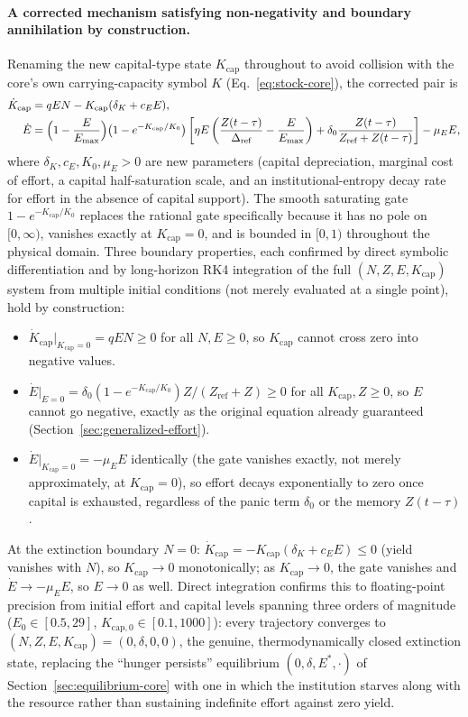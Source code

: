 \documentclass[twocolumn,10pt]{article}
\begin{document}
\paragraph{A corrected mechanism satisfying non-negativity and boundary annihilation by construction.} Renaming the new capital-type state $K_{\text{cap}}$ throughout to avoid collision with the core's own carrying-capacity symbol $K$ (Eq.~\eqref{eq:stock-core}), the corrected pair is
\begin{align}
\dot K_{\text{cap}} &= qEN - K_{\text{cap}}(\delta_K+c_EE), \label{eq:kcap-tether}\\
\dot E &= \Bigl(1-\frac{E}{E_{\max}}\Bigr)\bigl(1-e^{-K_{\text{cap}}/K_0}\bigr)\left[\eta E\left(\frac{Z(t-\tau)}{\Delta_{\text{ref}}}-\frac{E}{E_{\max}}\right)+\delta_0\frac{Z(t-\tau)}{Z_{\text{ref}}+Z(t-\tau)}\right]-\mu_EE, \label{eq:effort-tethered}
\end{align}
where $\delta_K,c_E,K_0,\mu_E>0$ are new parameters (capital depreciation, marginal cost of effort, a capital half-saturation scale, and an institutional-entropy decay rate for effort in the absence of capital support). The smooth saturating gate $1-e^{-K_{\text{cap}}/K_0}$ replaces the rational gate specifically because it has no pole on $[0,\infty)$, vanishes exactly at $K_{\text{cap}}=0$, and is bounded in $[0,1)$ throughout the physical domain. Three boundary properties, each confirmed by direct symbolic differentiation and by long-horizon RK4 integration of the full $(N,Z,E,K_{\text{cap}})$ system from multiple initial conditions (not merely evaluated at a single point), hold by construction:
\begin{itemize}
\item $\dot K_{\text{cap}}|_{K_{\text{cap}}=0}=qEN\ge0$ for all $N,E\ge0$, so $K_{\text{cap}}$ cannot cross zero into negative values.
\item $\dot E|_{E=0}=\delta_0(1-e^{-K_{\text{cap}}/K_0})Z/(Z_{\text{ref}}+Z)\ge0$ for all $K_{\text{cap}},Z\ge0$, so $E$ cannot go negative, exactly as the original equation already guaranteed (Section~\ref{sec:generalized-effort}).
\item $\dot E|_{K_{\text{cap}}=0}=-\mu_EE$ identically (the gate vanishes exactly, not merely approximately, at $K_{\text{cap}}=0$), so effort decays exponentially to zero once capital is exhausted, regardless of the panic term $\delta_0$ or the memory $Z(t-\tau)$.
\end{itemize}
At the extinction boundary $N=0$: $\dot K_{\text{cap}}=-K_{\text{cap}}(\delta_K+c_EE)\le0$ (yield vanishes with $N$), so $K_{\text{cap}}\to0$ monotonically; as $K_{\text{cap}}\to0$, the gate vanishes and $\dot E\to-\mu_EE$, so $E\to0$ as well. Direct integration confirms this to floating-point precision from initial effort and capital levels spanning three orders of magnitude ($E_0\in[0.5,29]$, $K_{\text{cap},0}\in[0.1,1000]$): every trajectory converges to $(N,Z,E,K_{\text{cap}})=(0,\delta,0,0)$, the genuine, thermodynamically closed extinction state, replacing the ``hunger persists'' equilibrium $(0,\delta,E^*,\cdot)$ of Section~\ref{sec:equilibrium-core} with one in which the institution starves along with the resource rather than sustaining indefinite effort against zero yield.
\end{document}

